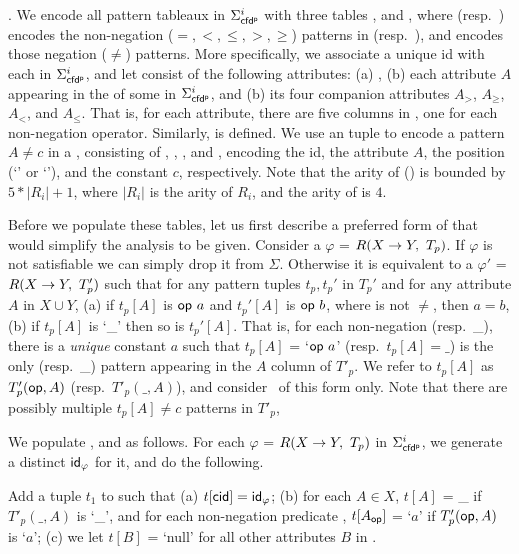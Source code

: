 . We encode all  pattern tableaux
in $\Sigma_{{\mathsf{cfd^p}}}^i$ with three tables ,  and \Enc{\ne}, where
 (resp.~) encodes the non-negation ($=,<,
\le, >, \ge$) patterns in \LHS (resp.~\RHS),
and
\Enc{\ne} encodes those negation ($\ne$) patterns.
More specifically, we associate a unique id  with each
\pCFDs in $\Sigma_{{\mathsf{cfd^p}}}^i$, and let
 consist of the following
attributes: (a) , (b)
each attribute $A$ appearing in the \LHS of some \pCFDs in $\Sigma_{{\mathsf{cfd^p}}}^i$, and
 (b) its four companion attributes $A_{>}$, $A_{\ge}$, $A_{<}$, and
 $A_{\le}$. That is, for each attribute, there are five columns in
 , one for each non-negation operator.
Similarly,  is defined. We use an \Enc{\ne} tuple to encode a
pattern $A \ne c$ in a \pCFD, consisting of , ,
, and , encoding the \pCFD id, the attribute $A$,
the position (`\LHS' or `\RHS'), and the constant $c$, respectively.
Note that the arity of  () is bounded by $5*|R_i|+1$,
where $|R_i|$ is the arity of $R_i$, and the arity of \Enc{\ne} is
$4$.

Before we populate these tables, let us first describe a preferred
form of \pCFDs that would simplify the analysis to be given.
Consider a \pCFD $\varphi$ = $R(X\rightarrow Y,\ T_p)$. If $\varphi$ is not
satisfiable we can simply drop it from $\Sigma$. Otherwise it is
equivalent to a \pCFD $\varphi'$ = $R(X\rightarrow Y,\ T_p')$ such that for
any pattern tuples $t_p, t_p'$ in $T_p'$ and for any attribute $A$
in $X\cup Y$, (a) if $t_p[A]$ is $\op a$ and $t_p'[A]$ is $\op b$,
where \op is not $\ne$, then $a=b$, (b) if $t_p[A]$ is `\_' then so
is $t_p'[A]$. That is, for each non-negation \op (resp.~\_), there
is a {\em unique} constant $a$ such that $t_p[A]$ = `$\op a$'
(resp.~$t_p[A]=\_$) is the only \op (resp.~\_) pattern appearing in
the $A$ column of $T'_p$. We refer to $t_p[A]$ as $T'_p({\mathsf{op}},A)$
(resp.~$T'_p(\_,A)$), and consider \kwlog~\pCFDs of this form only.
Note that there are possibly multiple $t_p[A] \ne c$ patterns in
$T'_p$,

We populate ,  and \Enc{\ne}  as follows. For each
\pCFD $\varphi$ = $R(X\rightarrow Y,\ T_p)$ in $\Sigma_{{\mathsf{cfd^p}}}^i$,
we generate a distinct  ${\mathsf{id}}_\varphi$ for it, and do the following.
\bi
\item[(1)] Add a tuple $t_1$ to  such that
(a) $t[\protect\mathsf{cid}] = {\mathsf{id}}_\varphi$; (b) for each $A\in X$,
$t[A]$ = \_ if $T'_p(\_,A)$ is `\_', and for each non-negation
predicate \op, $t[A_{{\mathsf{op}}}]$ = `$a$' if $T'_p({\mathsf{op}},A)$
is `\op $a$'; (c) we let $t[B]$ = `null' for all other attributes $B$
in .



